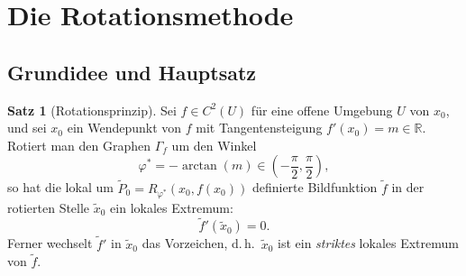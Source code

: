 ﻿\documentclass[12pt, a4paper]{article}
\theoremstyle{definition}
\newtheorem{satz}{Satz}[section]
\begin{document}
	\section{Die Rotationsmethode}
	
	\subsection{Grundidee und Hauptsatz}
	
	\begin{satz}[Rotationsprinzip]\label{satz:rotation}
		Sei $f \in C^2(U)$ für eine offene Umgebung $U$ von $x_0$, und sei $x_0$
		ein Wendepunkt von $f$ mit Tangentensteigung $f'(x_0) = m \in \mathbb{R}$.
		Rotiert man den Graphen $\Gamma_f$ um den Winkel
		\[
		\varphi^* = -\arctan(m) \in \left(-\frac{\pi}{2}, \frac{\pi}{2}\right),
		\]
		so hat die lokal um $\tilde{P}_0 = R_{\varphi^*}(x_0, f(x_0))$ definierte
		Bildfunktion $\tilde{f}$ in der rotierten Stelle $\tilde{x}_0$ ein lokales
		Extremum:
		\[
		\tilde{f}'(\tilde{x}_0) = 0.
		\]
		Ferner wechselt $\tilde{f}'$ in $\tilde{x}_0$ das Vorzeichen, d.\,h.\
		$\tilde{x}_0$ ist ein \emph{striktes} lokales Extremum von $\tilde{f}$.
	\end{satz}
	
\end{document}
